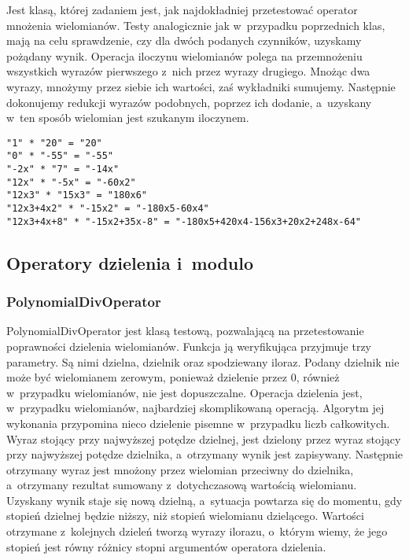 Jest klasą, której zadaniem jest, jak najdokładniej przetestować operator mnożenia wielomianów. Testy analogicznie jak w~przypadku poprzednich klas, mają na celu sprawdzenie, czy dla dwóch podanych czynników, uzyskamy pożądany wynik. Operacja iloczynu wielomianów polega na przemnożeniu wszystkich wyrazów pierwszego z~nich przez wyrazy drugiego. Mnożąc dwa wyrazy, mnożymy przez siebie ich wartości, zaś wykładniki sumujemy. Następnie dokonujemy redukcji wyrazów podobnych, poprzez ich dodanie, a~uzyskany w~ten sposób wielomian jest szukanym iloczynem.

\begin{lstlisting}
"1" * "20" = "20"
"0" * "-55" = "-55"
"-2x" * "7" = "-14x"
"12x" * "-5x" = "-60x2"
"12x3" * "15x3" = "180x6"
"12x3+4x2" * "-15x2" = "-180x5-60x4"
"12x3+4x+8" * "-15x2+35x-8" = "-180x5+420x4-156x3+20x2+248x-64"
\end{lstlisting}

\subsection{Operatory dzielenia i~modulo}

\subsubsection{PolynomialDivOperator}

PolynomialDivOperator jest klasą testową, pozwalającą na przetestowanie poprawności dzielenia wielomianów. Funkcja ją weryfikująca przyjmuje trzy parametry. Są nimi dzielna, dzielnik oraz spodziewany iloraz. Podany dzielnik nie może być wielomianem zerowym, ponieważ dzielenie przez $0$, również w~przypadku wielomianów, nie jest dopuszczalne. Operacja dzielenia jest, w~przypadku wielomianów, najbardziej skomplikowaną operacją. Algorytm jej wykonania przypomina nieco dzielenie pisemne w~przypadku liczb całkowitych. Wyraz stojący przy najwyższej potędze dzielnej, jest dzielony przez wyraz stojący przy najwyższej potędze dzielnika, a~otrzymany wynik jest zapisywany. Następnie otrzymany wyraz jest mnożony przez wielomian przeciwny do dzielnika, a~otrzymany rezultat sumowany z~dotychczasową wartością wielomianu. Uzyskany wynik staje się nową dzielną, a~sytuacja powtarza się do momentu, gdy stopień dzielnej będzie niższy, niż stopień wielomianu dzielącego. Wartości otrzymane z~kolejnych dzieleń tworzą wyrazy ilorazu, o~którym wiemy, że jego stopień jest równy różnicy stopni argumentów operatora dzielenia.

